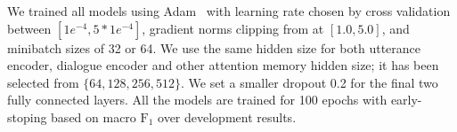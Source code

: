 We trained all models using Adam~\cite{kingma2014adam} with learning
rate chosen by cross validation between $[1e^{-4}, 5*1e^{-4}]$,
gradient norms clipping from at $[1.0, 5.0]$, and minibatch sizes of
32 or 64. We use the same hidden size for both utterance encoder,
dialogue encoder and other attention memory hidden size; it has been
selected from $\{64, 128, 256, 512\}$. We set a smaller dropout 0.2
for the final two fully connected layers. All the models are trained
for 100 epochs with early-stoping based on macro $\text{F}_{1}$ over
development results.




